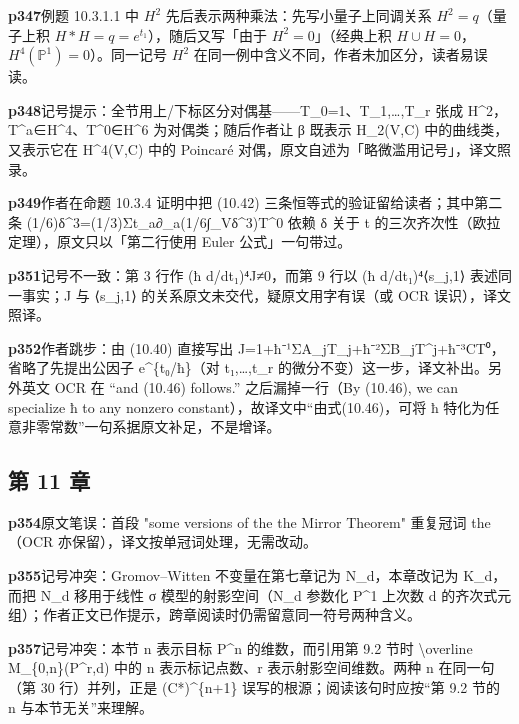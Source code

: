 \noindent\textbf{\footnotesize p347}\quad 例题 10.3.1.1 中 $H^2$ 先后表示两种乘法：先写小量子上同调关系 $H^2=q$（量子上积 $H*H=q=e^{t_1}$），随后又写「由于 $H^2=0$」（经典上积 $H\cup H=0$，$H^4(\mathbb P^1)=0$）。同一记号 $H^2$ 在同一例中含义不同，作者未加区分，读者易误读。

\noindent\textbf{\footnotesize p348}\quad 记号提示：全节用上/下标区分对偶基——T\_0=1、T\_1,…,T\_r 张成 H\^{}2，T\^{}a∈H\^{}4、T\^{}0∈H\^{}6 为对偶类；随后作者让 β 既表示 H\_2(V,C) 中的曲线类，又表示它在 H\^{}4(V,C) 中的 Poincaré 对偶，原文自述为「略微滥用记号」，译文照录。

\noindent\textbf{\footnotesize p349}\quad 作者在命题 10.3.4 证明中把 (10.42) 三条恒等式的验证留给读者；其中第二条 (1/6)δ\^{}3=(1/3)Σt\_a∂\_a(1/6∫\_Vδ\^{}3)T\^{}0 依赖 δ 关于 t 的三次齐次性（欧拉定理），原文只以「第二行使用 Euler 公式」一句带过。

\noindent\textbf{\footnotesize p351}\quad 记号不一致：第 3 行作 (ħ d/dt₁)⁴J≠0，而第 9 行以 (ħ d/dt₁)⁴⟨s\_j,1⟩ 表述同一事实；J 与 ⟨s\_j,1⟩ 的关系原文未交代，疑原文用字有误（或 OCR 误识），译文照译。

\noindent\textbf{\footnotesize p352}\quad 作者跳步：由 (10.40) 直接写出 J=1+ħ⁻¹ΣA\_jT\_j+ħ⁻²ΣB\_jT\^{}j+ħ⁻³CT⁰，省略了先提出公因子 e\^{}\{t₀/ħ\}（对 t₁,…,t\_r 的微分不变）这一步，译文补出。另外英文 OCR 在 “and (10.46) follows.” 之后漏掉一行（By (10.46), we can specialize ħ to any nonzero constant），故译文中“由式(10.46)，可将 ħ 特化为任意非零常数”一句系据原文补足，不是增译。


\subsection*{第 11 章}

\noindent\textbf{\footnotesize p354}\quad 原文笔误：首段 "some versions of the the Mirror Theorem" 重复冠词 the（OCR 亦保留），译文按单冠词处理，无需改动。

\noindent\textbf{\footnotesize p355}\quad 记号冲突：Gromov–Witten 不变量在第七章记为 N\_d，本章改记为 K\_d，而把 N\_d 移用于线性 σ 模型的射影空间（N\_d 参数化 P\^{}1 上次数 d 的齐次式元组）；作者正文已作提示，跨章阅读时仍需留意同一符号两种含义。

\noindent\textbf{\footnotesize p357}\quad 记号冲突：本节 n 表示目标 P\^{}n 的维数，而引用第 9.2 节时 \textbackslash{}overline M\_\{0,n\}(P\^{}r,d) 中的 n 表示标记点数、r 表示射影空间维数。两种 n 在同一句（第 30 行）并列，正是 (C*)\^{}\{n+1\} 误写的根源；阅读该句时应按“第 9.2 节的 n 与本节无关”来理解。

